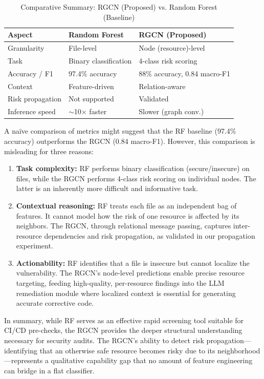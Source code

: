 \documentclass[conference]{IEEEtran}
\begin{document}
\begin{table}[htbp]
\caption{Comparative Summary: RGCN (Proposed) vs. Random Forest (Baseline)}
\label{tab:comparison}
\centering
\begin{tabular}{lll}
\toprule
\textbf{Aspect} & \textbf{Random Forest} & \textbf{RGCN (Proposed)} \\
\midrule
Granularity & File-level & Node (resource)-level \\
Task & Binary classification & 4-class risk scoring \\
Accuracy / F1 & 97.4\% accuracy & 88\% accuracy, 0.84 macro-F1 \\
Context & Feature-driven & Relation-aware \\
Risk propagation & Not supported & Validated \\
Inference speed & $\sim$10$\times$ faster & Slower (graph conv.) \\
\bottomrule
\end{tabular}
\end{table}

A na\"ive comparison of metrics might suggest that the RF baseline (97.4\% accuracy) outperforms the RGCN (0.84 macro-F1). However, this comparison is misleading for three reasons:

\begin{enumerate}
    \item \textbf{Task complexity:} RF performs binary classification (secure/insecure) on files, while the RGCN performs 4-class risk scoring on individual nodes. The latter is an inherently more difficult and informative task.
    \item \textbf{Contextual reasoning:} RF treats each file as an independent bag of features. It cannot model how the risk of one resource is affected by its neighbors. The RGCN, through relational message passing, captures inter-resource dependencies and risk propagation, as validated in our propagation experiment.
    \item \textbf{Actionability:} RF identifies that a file is insecure but cannot localize the vulnerability. The RGCN's node-level predictions enable precise resource targeting, feeding high-quality, per-resource findings into the LLM remediation module where localized context is essential for generating accurate corrective code.
\end{enumerate}

In summary, while RF serves as an effective rapid screening tool suitable for CI/CD pre-checks, the RGCN provides the deeper structural understanding necessary for security audits. The RGCN's ability to detect risk propagation---identifying that an otherwise safe resource becomes risky due to its neighborhood---represents a qualitative capability gap that no amount of feature engineering can bridge in a flat classifier.
\end{document}
